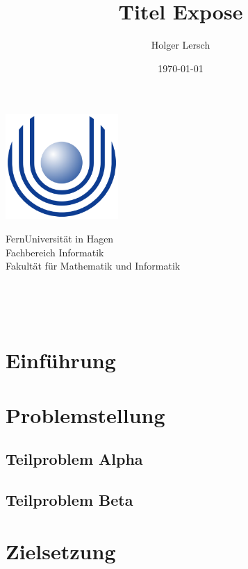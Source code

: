 \documentclass[a4paper,oneside,11pt]{article}
\title{Titel Expose}
\author{Holger Lersch}
\date{\today}
\begin{document}
\begin{titlingpage} %
\begin{center}
\includegraphics[height=4cm]{images/Uni_hagen_logo}\\ %
\begin{large}
FernUniversit\"at in Hagen \\ %
Fachbereich Informatik\\
Fakult\"at f\"ur Mathematik und Informatik\\
\end{large}
\vspace{4cm} %
\begin{large} 
\textbf{\thetitle} \\
\end{large}
\theauthor\\
\vspace{7cm} %
\thedate
\end{center}
\end{titlingpage}

\section{Einf\"uhrung}


\section{Problemstellung}

\subsection{Teilproblem Alpha}

\subsection{Teilproblem Beta}


\section{Zielsetzung}

\end{document}
